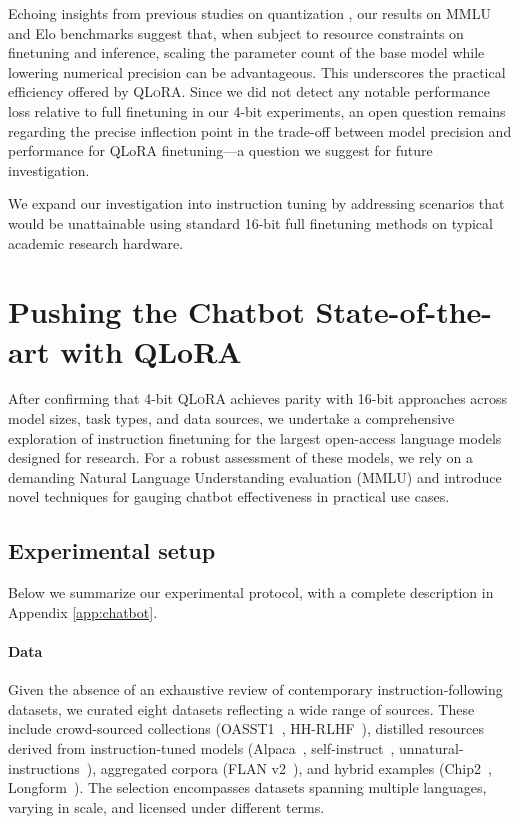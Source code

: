 Echoing insights from previous studies on quantization \citep{dettmers2022case}, our results on MMLU and Elo benchmarks suggest that, when subject to resource constraints on finetuning and inference, scaling the parameter count of the base model while lowering numerical precision can be advantageous. This underscores the practical efficiency offered by \textsc{QLoRA}. Since we did not detect any notable performance loss relative to full finetuning in our 4-bit experiments, an open question remains regarding the precise inflection point in the trade-off between model precision and performance for QLoRA finetuning—a question we suggest for future investigation.

We expand our investigation into instruction tuning by addressing scenarios that would be unattainable using standard 16-bit full finetuning methods on typical academic research hardware.

\section{Pushing the Chatbot State-of-the-art with QLoRA}
\label{sec:pushing}
After confirming that 4-bit \textsc{QLoRA} achieves parity with 16-bit approaches across model sizes, task types, and data sources, we undertake a comprehensive exploration of instruction finetuning for the largest open-access language models designed for research. For a robust assessment of these models, we rely on a demanding Natural Language Understanding evaluation (MMLU) and introduce novel techniques for gauging chatbot effectiveness in practical use cases.

\subsection{Experimental setup} Below we summarize our experimental protocol, with a complete description in Appendix \ref{app:chatbot}.

\paragraph{Data} Given the absence of an exhaustive review of contemporary instruction-following datasets, we curated eight datasets reflecting a wide range of sources. These include crowd-sourced collections (OASST1~\citep{kopf2023openassistant}, HH-RLHF~\citep{bai2022training}), distilled resources derived from instruction-tuned models (Alpaca~\citep{alpaca}, self-instruct~\citep{wang2022self}, unnatural-instructions~\citep{honovich2022unnatural}), aggregated corpora (FLAN v2~\citep{chung2022scaling}), and hybrid examples (Chip2~\citep{laion2023}, Longform~\citep{koksal2023longform}). The selection encompasses datasets spanning multiple languages, varying in scale, and licensed under different terms.

